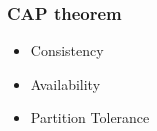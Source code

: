
\begin{frame}
    \frametitle{CAP theorem}
    \begin{itemize}
        \item Consistency
        \item Availability
        \item Partition Tolerance
    \end{itemize}
\end{frame}
